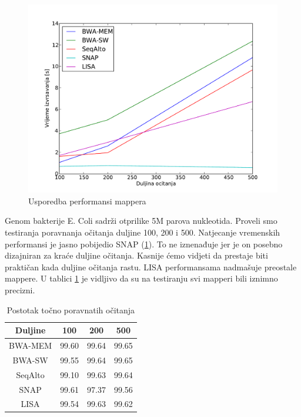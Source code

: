 \documentclass[times, utf8, diplomski]{fer}
\begin{document}
\begin{figure}[H]
\centering
\includegraphics[width=1.0\textwidth]{../img/ecoli-time.pdf}
\caption{Usporedba performansi mappera}
\label{ecoli-time}
\end{figure}

Genom bakterije E. Coli sadrži otprilike 5M parova nukleotida. Proveli smo testiranja poravnanja očitanja duljine 100, 200 i 500. Natjecanje vremenskih performansi je jasno pobijedio SNAP (\ref{ecoli-time}). To ne iznenađuje jer je on posebno dizajniran za kraće duljine očitanja. Kasnije ćemo vidjeti da prestaje biti praktičan kada duljine očitanja rastu. LISA performansama nadmašuje preostale mappere. U tablici \ref{ecoli-correct} je vidljivo da su na testiranju svi mapperi bili iznimno precizni.

\begin{table}[H]
\centering
\begin{tabular}{|c||c|c|c|}
\hline
	Duljine & 100 & 200 & 500\\
\hline
\hline
	BWA-MEM & 99.60 & 99.64 & 99.65\\
\hline
	BWA-SW  & 99.55 & 99.64 & 99.65\\
\hline
	SeqAlto & 99.10 & 99.63 & 99.64\\
\hline
	SNAP    & 99.61 & 97.37 & 99.56\\
\hline
	LISA    & 99.54 & 99.63 & 99.62\\
\hline
\end{tabular}
\caption{Postotak točno poravnatih očitanja}\label{ecoli-correct}
\end{table}
\end{document}
